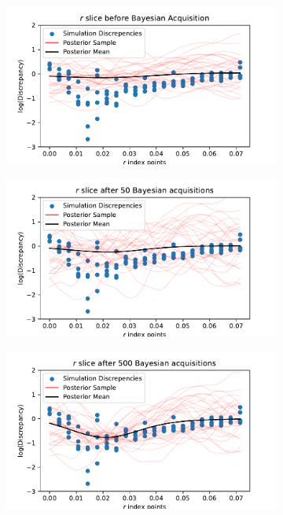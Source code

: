 \begin{figure}[htbp]
\begin{subfigure}[b]{0.33\textwidth}
    \end{subfigure}
    \hfill%
    \begin{subfigure}[b]{0.33\textwidth}
        \centering
        \includegraphics[width=\textwidth]{../champagne_GP_images/initial_r_slice_log_discrep.pdf}
    \end{subfigure}%
    \hfill%
    \begin{subfigure}[b]{0.33\textwidth}
        \centering
        \includegraphics[width=\textwidth]{../champagne_GP_images/r_slice_50_bolfi_updates_log_discrep.pdf}
    \end{subfigure}%
    \hfill%
    \begin{subfigure}[b]{0.33\textwidth}
        \centering
        \includegraphics[width=\textwidth]{../champagne_GP_images/r_slice_500_bolfi_updates_log_discrep.pdf}

\end{subfigure}
\end{figure}
